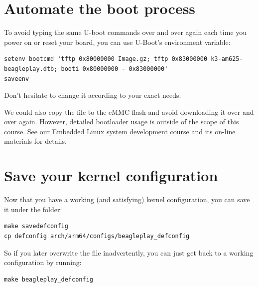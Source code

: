 \section{Automate the boot process}

To avoid typing the same U-boot commands over and over again each time
you power on or reset your board, you can use U-Boot's 
environment variable:

{\footnotesize
\begin{verbatim}
setenv bootcmd 'tftp 0x80000000 Image.gz; tftp 0x83000000 k3-am625-beagleplay.dtb; booti 0x80000000 - 0x83000000'
saveenv
\end{verbatim}
}

Don't hesitate to change it according to your exact needs.

We could also copy the  file to the eMMC flash and avoid
downloading it over and over again. However, detailed bootloader
usage is outside of the scope of this course. See our
\href{https://bootlin.com/training/embedded-linux/}{Embedded
Linux system development course} and its on-line materials for
details.

\section{Save your kernel configuration}

Now that you have a working (and satisfying) kernel configuration, you
can save it under the  folder:

\begin{verbatim}
make savedefconfig
cp defconfig arch/arm64/configs/beagleplay_defconfig
\end{verbatim}

So if you later overwrite the  file inadvertently, you can
just get back to a working configuration by running:

\begin{verbatim}
make beagleplay_defconfig
\end{verbatim}
